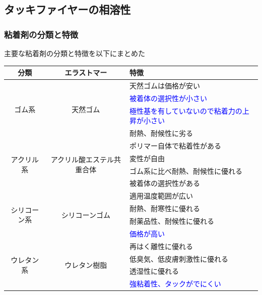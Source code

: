 \documentclass[12pt, dvipdfmx]{beamer}
\begin{document}
\subsection{タッキファイヤーの相溶性}
\begin{frame}
	\frametitle{粘着剤の分類と特徴}

		主要な粘着剤の分類と特徴を以下にまとめた

		\begin{table}[tb]
			\tiny
			\centering
				\begin{tabular}{ccl}
				\toprule
				分類&エラストマー&特徴 \\
				\midrule
				\multirow{4}{*}{ゴム系}&\multirow{4}{*}{天然ゴム}&天然ゴムは価格が安い\\
				&&\textcolor{blue}{被着体の選択性が小さい}\\
				&&\textcolor{blue}{極性基を有していないので粘着力の上昇が小さい}\\
				&&耐熱、耐候性に劣る\\
				\midrule
				\multirow{4}{*}{アクリル系}&\multirow{4}{*}{アクリル酸エステル共重合体}&\alert{ポリマー自体で粘着性がある}\\
				&&\alert{変性が自由}\\
				&&ゴム系に比べ耐熱、耐候性に優れる\\
				&&被着体の選択性がある\\
				\midrule
				\multirow{4}{*}{シリコーン系}&\multirow{4}{*}{シリコーンゴム}&適用温度範囲が広い\\
				&&耐熱、耐寒性に優れる\\
				&&耐薬品性、耐候性に優れる\\
				&&\textcolor{blue}{価格が高い}\\
				\midrule
				\multirow{4}{*}{ウレタン系}&\multirow{4}{*}{ウレタン樹脂}&再はく離性に優れる\\
				&&低臭気、低皮膚刺激性に優れる\\
				&&透湿性に優れる\\
				&&\textcolor{blue}{強粘着性、タックがでにくい}\\
				\bottomrule
				\end{tabular}
		\end{table}
\end{frame}
\end{document}
